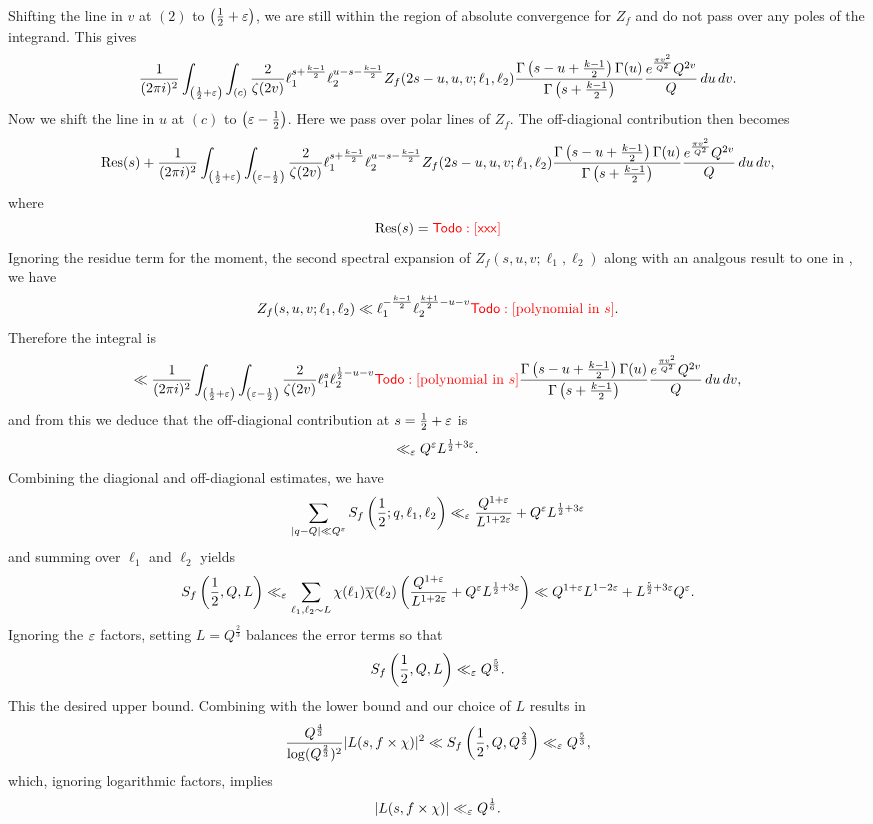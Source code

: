 \documentclass[12pt,reqno,oneside]{amsart}
\begin{document}
  Shifting the line in $v$ at $(2)$ to $\left(\frac{1}{2}+\varepsilon\right)$, we are still within the region of absolute convergence for $Z_{f}$ and do not pass over any poles of the integrand. This gives
  \[
    \frac{1}{(2\pi i)^{2}}\int_{\left(\frac{1}{2}+\varepsilon\right)}\int_{(c)}\frac{2}{\zeta(2v)}\ell_{1}^{s+\frac{k-1}{2}}\ell_{2}^{u-s-\frac{k-1}{2}}Z_{f}(2s-u,u,v;\ell_{1},\ell_{2})\frac{\Gamma\left(s-u+\frac{k-1}{2}\right)\Gamma(u)}{\Gamma\left(s+\frac{k-1}{2}\right)}\frac{e^{\frac{\pi v^{2}}{Q^{2}}}Q^{2v}}{Q}\,du\,dv.
  \]
  Now we shift the line in $u$ at $(c)$ to $\left(\varepsilon-\frac{1}{2}\right)$. Here we pass over polar lines of $Z_{f}$. The off-diagional contribution then becomes
  \[
    \operatorname*{\mathrm{Res}}(s)+\frac{1}{(2\pi i)^{2}}\int_{\left(\frac{1}{2}+\varepsilon\right)}\int_{\left(\varepsilon-\frac{1}{2}\right)}\frac{2}{\zeta(2v)}\ell_{1}^{s+\frac{k-1}{2}}\ell_{2}^{u-s-\frac{k-1}{2}}Z_{f}(2s-u,u,v;\ell_{1},\ell_{2})\frac{\Gamma\left(s-u+\frac{k-1}{2}\right)\Gamma(u)}{\Gamma\left(s+\frac{k-1}{2}\right)}\frac{e^{\frac{\pi v^{2}}{Q^{2}}}Q^{2v}}{Q}\,du\,dv,
  \]
  where
  \[
    \operatorname*{\mathrm{Res}}(s) = \textcolor{red}{\sf Todo: [xxx]}
  \]
  Ignoring the residue term for the moment, the second spectral expansion of $Z_{f}(s,u,v;\ell_{1},\ell_{2})$ along with an analgous result to one in \cite{HHR}, we have
  \[
    Z_{f}(s,u,v;\ell_{1},\ell_{2}) \ll \ell_{1}^{-\frac{k-1}{2}}\ell_{2}^{\frac{k+1}{2}-u-v}\textcolor{red}{\sf Todo: [\text{polynomial in $s$}]}.
  \]
  Therefore the integral is
  \[
    \ll \frac{1}{(2\pi i)^{2}}\int_{\left(\frac{1}{2}+\varepsilon\right)}\int_{\left(\varepsilon-\frac{1}{2}\right)}\frac{2}{\zeta(2v)}\ell_{1}^{s}\ell_{2}^{\frac{1}{2}-u-v}\textcolor{red}{\sf Todo: [\text{polynomial in $s$}]}\frac{\Gamma\left(s-u+\frac{k-1}{2}\right)\Gamma(u)}{\Gamma\left(s+\frac{k-1}{2}\right)}\frac{e^{\frac{\pi v^{2}}{Q^{2}}}Q^{2v}}{Q}\,du\,dv,
  \]
  and from this we deduce that the off-diagional contribution at $s = \frac{1}{2}+\varepsilon$ is
  \[
    \ll_{\varepsilon} Q^{\varepsilon}L^{\frac{1}{2}+3\varepsilon}.
  \]
  Combining the diagional and off-diagional estimates, we have
  \[
    \sum_{|q-Q| \ll Q^{\varepsilon}}S_{f}\left(\frac{1}{2};q,\ell_{1},\ell_{2}\right) \ll_{\varepsilon} \frac{Q^{1+\varepsilon}}{L^{1+2\varepsilon}}+Q^{\varepsilon}L^{\frac{1}{2}+3\varepsilon}
  \]
  and summing over $\ell_{1}$ and $\ell_{2}$ yields
  \[
    S_{f}\left(\frac{1}{2},Q,L\right) \ll_{\varepsilon} \sum_{\ell_{1},\ell_{2} \sim L}\chi(\ell_{1})\overline{\chi}(\ell_{2})\left(\frac{Q^{1+\varepsilon}}{L^{1+2\varepsilon}}+Q^{\varepsilon}L^{\frac{1}{2}+3\varepsilon}\right) \ll Q^{1+\varepsilon}L^{1-2\varepsilon}+L^{\frac{5}{2}+3\varepsilon}Q^{\varepsilon}.
  \]
  Ignoring the $\varepsilon$ factors, setting $L = Q^{\frac{2}{3}}$ balances the error terms so that
  \[
    S_{f}\left(\frac{1}{2},Q,L\right) \ll_{\varepsilon} Q^{\frac{5}{3}}.
  \]
  This the desired upper bound. Combining with the lower bound and our choice of $L$ results in
  \[
      \frac{Q^{\frac{4}{3}}}{\log(Q^{\frac{2}{3}})^{2}}|L(s,f \times \chi)|^{2} \ll S_{f}\left(\frac{1}{2},Q,Q^{\frac{2}{3}}\right) \ll_{\varepsilon} Q^{\frac{5}{3}},
  \]
  which, ignoring logarithmic factors, implies
  \[
    |L(s,f \times \chi)| \ll_{\varepsilon} Q^{\frac{1}{6}}.
  \]
\end{document}
